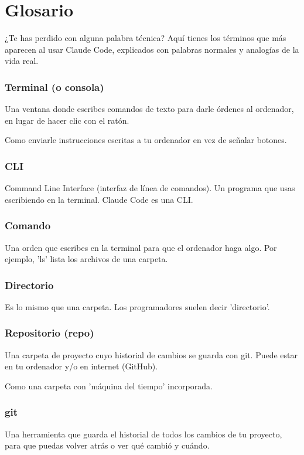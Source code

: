 \documentclass[11pt,a4paper]{book}
\begin{document}
\chapter{Glosario}
¿Te has perdido con alguna palabra técnica? Aquí tienes los términos que más aparecen al usar Claude Code, explicados con palabras normales y analogías de la vida real.

\subsection{Terminal (o consola)}
Una ventana donde escribes comandos de texto para darle órdenes al ordenador, en lugar de hacer clic con el ratón.

Como enviarle instrucciones escritas a tu ordenador en vez de señalar botones.

\subsection{CLI}
Command Line Interface (interfaz de línea de comandos). Un programa que usas escribiendo en la terminal. Claude Code es una CLI.

\subsection{Comando}
Una orden que escribes en la terminal para que el ordenador haga algo. Por ejemplo, 'ls' lista los archivos de una carpeta.

\subsection{Directorio}
Es lo mismo que una carpeta. Los programadores suelen decir 'directorio'.

\subsection{Repositorio (repo)}
Una carpeta de proyecto cuyo historial de cambios se guarda con git. Puede estar en tu ordenador y/o en internet (GitHub).

Como una carpeta con 'máquina del tiempo' incorporada.

\subsection{git}
Una herramienta que guarda el historial de todos los cambios de tu proyecto, para que puedas volver atrás o ver qué cambió y cuándo.
\end{document}
